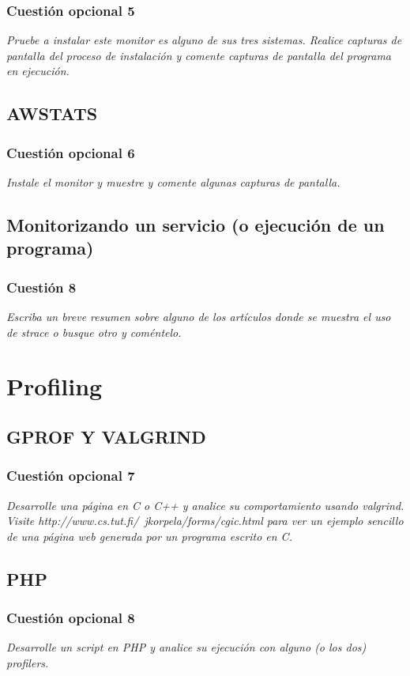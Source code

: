 \subsubsection{Cuestión opcional 5}
\textit{Pruebe a instalar este monitor es alguno de sus tres sistemas. Realice capturas de pantalla del proceso de instalación y comente capturas de pantalla del programa en ejecución.}
\subsection{AWSTATS}


\subsubsection{Cuestión opcional 6}
\textit{Instale el monitor y muestre y comente algunas capturas de pantalla.}
\subsection{Monitorizando un servicio (o ejecución de un programa)}

\subsubsection{Cuestión 8}
\textit{Escriba un breve resumen sobre alguno de los artículos donde se muestra el uso de strace o busque otro y coméntelo.}
\section{Profiling}
\subsection{GPROF Y VALGRIND}


\subsubsection{Cuestión opcional 7}
\textit{Desarrolle una página en C o C++ y analice su comportamiento usando valgrind. Visite http://www.cs.tut.fi/~jkorpela/forms/cgic.html para ver un ejemplo sencillo de una página web generada por un programa escrito en C.}
\subsection{PHP}


\subsubsection{Cuestión opcional 8}
\textit{Desarrolle un script en PHP y analice su ejecución con alguno (o los dos) profilers.}
